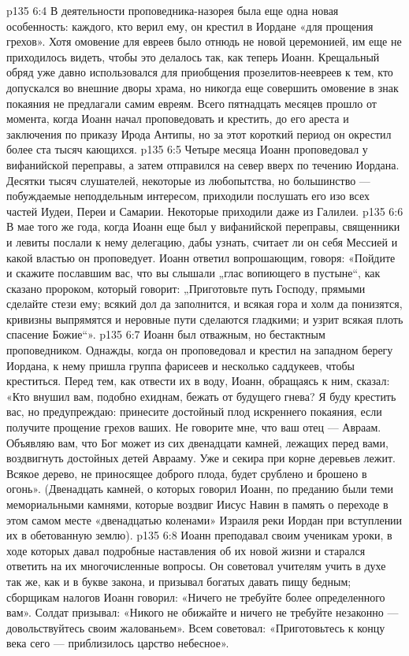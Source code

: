 \vs p135 6:4 В деятельности проповедника\hyp{}назорея была еще одна новая особенность: каждого, кто верил ему, он крестил в Иордане «для прощения грехов». Хотя омовение для евреев было отнюдь не новой церемонией, им еще не приходилось видеть, чтобы это делалось так, как теперь Иоанн. Крещальный обряд уже давно использовался для приобщения прозелитов\hyp{}неевреев к тем, кто допускался во внешние дворы храма, но никогда еще совершить омовение в знак покаяния не предлагали самим евреям. Всего пятнадцать месяцев прошло от момента, когда Иоанн начал проповедовать и крестить, до его ареста и заключения по приказу Ирода Антипы, но за этот короткий период он окрестил более ста тысяч кающихся.
\vs p135 6:5 Четыре месяца Иоанн проповедовал у вифанийской переправы, а затем отправился на север вверх по течению Иордана. Десятки тысяч слушателей, некоторые из любопытства, но большинство --- побуждаемые неподдельным интересом, приходили послушать его изо всех частей Иудеи, Переи и Самарии. Некоторые приходили даже из Галилеи.
\vs p135 6:6 В мае того же года, когда Иоанн еще был у вифанийской переправы, священники и левиты послали к нему делегацию, дабы узнать, считает ли он себя Мессией и какой властью он проповедует. Иоанн ответил вопрошающим, говоря: «Пойдите и скажите пославшим вас, что вы слышали „глас вопиющего в пустыне“, как сказано пророком, который говорит: „Приготовьте путь Господу, прямыми сделайте стези ему; всякий дол да заполнится, и всякая гора и холм да понизятся, кривизны выпрямятся и неровные пути сделаются гладкими; и узрит всякая плоть спасение Божие“».
\vs p135 6:7 Иоанн был отважным, но бестактным проповедником. Однажды, когда он проповедовал и крестил на западном берегу Иордана, к нему пришла группа фарисеев и несколько саддукеев, чтобы креститься. Перед тем, как отвести их в воду, Иоанн, обращаясь к ним, сказал: «Кто внушил вам, подобно ехиднам, бежать от будущего гнева? Я буду крестить вас, но предупреждаю: принесите достойный плод искреннего покаяния, если получите прощение грехов ваших. Не говорите мне, что ваш отец --- Авраам. Объявляю вам, что Бог может из сих двенадцати камней, лежащих перед вами, воздвигнуть достойных детей Аврааму. Уже и секира при корне деревьев лежит. Всякое дерево, не приносящее доброго плода, будет срублено и брошено в огонь». (Двенадцать камней, о которых говорил Иоанн, по преданию были теми мемориальными камнями, которые воздвиг Иисус Навин в память о переходе в этом самом месте «двенадцатью коленами» Израиля реки Иордан при вступлении их в обетованную землю).
\vs p135 6:8 Иоанн преподавал своим ученикам уроки, в ходе которых давал подробные наставления об их новой жизни и старался ответить на их многочисленные вопросы. Он советовал учителям учить в духе так же, как и в букве закона, и призывал богатых давать пищу бедным; сборщикам налогов Иоанн говорил: «Ничего не требуйте более определенного вам». Солдат призывал: «Никого не обижайте и ничего не требуйте незаконно --- довольствуйтесь своим жалованьем». Всем советовал: «Приготовьтесь к концу века сего --- приблизилось царство небесное».

